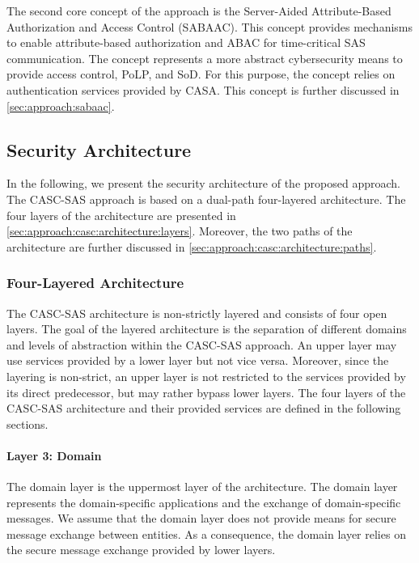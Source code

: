 The second core concept of the approach is the Server-Aided Attribute-Based Authorization and Access Control (SABAAC).
This concept provides mechanisms to enable attribute-based authorization and ABAC for time-critical SAS communication.
The concept represents a more abstract cybersecurity means to provide access control, PoLP, and SoD.
For this purpose, the concept relies on authentication services provided by CASA.
This concept is further discussed in \autoref{sec:approach:sabaac}.

\subsection{Security Architecture}
In the following, we present the security architecture of the proposed approach.
The CASC-SAS approach is based on a dual-path four-layered architecture.
The four layers of the architecture are presented in \autoref{sec:approach:casc:architecture:layers}.
Moreover, the two paths of the architecture are further discussed in \autoref{sec:approach:casc:architecture:paths}.

\subsubsection{Four-Layered Architecture}
\label{sec:approach:casc:architecture:layers}
The CASC-SAS architecture is non-strictly layered and consists of four open layers.
The goal of the layered architecture is the separation of different domains and levels of abstraction within the CASC-SAS approach.
An upper layer may use services provided by a lower layer but not vice versa.
Moreover, since the layering is non-strict, an upper layer is not restricted to the services provided by its direct predecessor, but may rather bypass lower layers.
The four layers of the CASC-SAS architecture and their provided services are defined in the following sections.

\paragraph{Layer 3: Domain}
The domain layer is the uppermost layer of the architecture.
The domain layer represents the domain-specific applications and the exchange of domain-specific messages.
We assume that the domain layer does not provide means for secure message exchange between entities.
As a consequence, the domain layer relies on the secure message exchange provided by lower layers.

